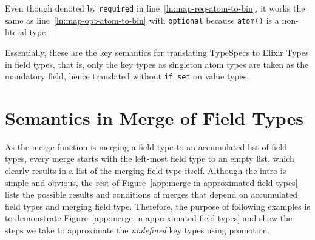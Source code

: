 Even though denoted by \texttt{required} in line~\ref{ln:map-req-atom-to-bin}, it works the same as line~\ref{ln:map-opt-atom-to-bin} with \texttt{optional} because \texttt{atom()} is a non-literal type.

Essentially, these are the key semantics for translating TypeSpecs to Elixir Types in field types, that is, only the key types as singleton atom types are taken as the mandatory field, hence translated without \texttt{if\_set} on value types.

\section*{Semantics in Merge of Field Types}

As the merge function is merging a field type to an accumulated list of field types, every merge starts with the left-most field type to an empty list, which clearly results in a list of the merging field type itself.
Although the intro is simple and obvious, the rest of Figure~\ref{app:merge-in-approximated-field-types} lists the possible results and conditions of merges that depend on accumulated field types and merging field type.
Therefore, the purpose of following examples is to demonstrate Figure~\ref{app:merge-in-approximated-field-types} and show the steps we take to approximate the \textit{undefined} key types using promotion.

